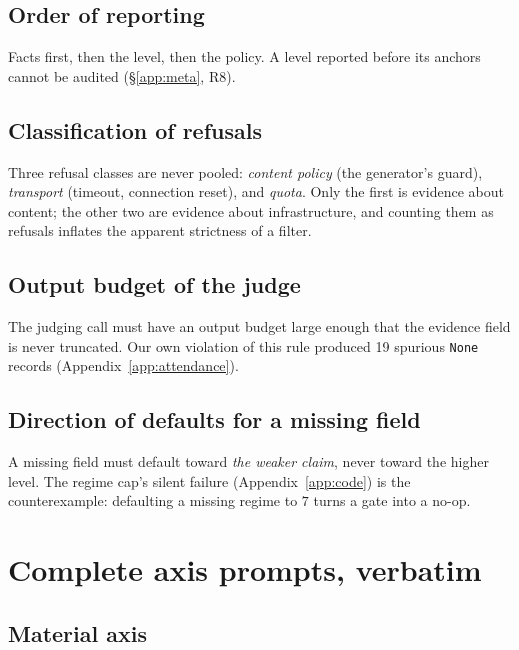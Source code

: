 \subsection{Order of reporting}

Facts first, then the level, then the policy. A level reported before its
anchors cannot be audited (\S\ref{app:meta}, R8).

\subsection{Classification of refusals}

Three refusal classes are never pooled: \emph{content policy} (the generator's
guard), \emph{transport} (timeout, connection reset), and \emph{quota}. Only
the first is evidence about content; the other two are evidence about
infrastructure, and counting them as refusals inflates the apparent strictness
of a filter.

\subsection{Output budget of the judge}

The judging call must have an output budget large enough that the evidence
field is never truncated. Our own violation of this rule produced 19 spurious
\texttt{None} records (Appendix~\ref{app:attendance}).

\subsection{Direction of defaults for a missing field}

A missing field must default toward \emph{the weaker claim}, never toward the
higher level. The regime cap's silent failure
(Appendix~\ref{app:code}) is the counterexample: defaulting a missing regime to
$7$ turns a gate into a no-op.

\section{Complete axis prompts, verbatim}
\label{app:axisprompts}

\subsection{Material axis}

